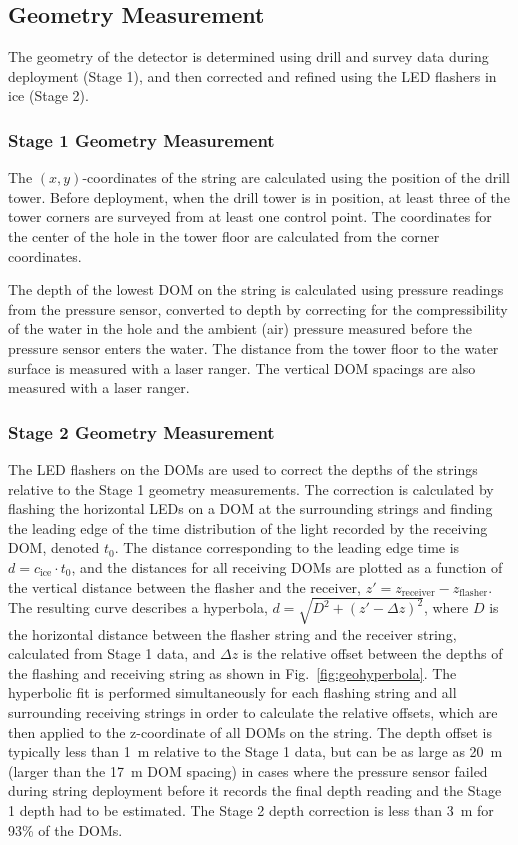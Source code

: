 \subsection{Geometry Measurement}

The geometry of the detector is determined using drill and survey data
during deployment (Stage 1), and then corrected and refined using the LED
flashers in ice (Stage 2).

\subsubsection{Stage 1 Geometry Measurement}
The $(x,y)$-coordinates of the string are calculated using the position of
the drill tower. Before deployment, when the drill tower is in position, at
least three of the tower corners are surveyed from at least one control
point.  The coordinates for the center of the hole in the tower floor are
calculated from the corner coordinates.

The depth of the lowest DOM on the string is calculated using pressure
readings from the pressure sensor, converted to depth by correcting for the
compressibility of the water in the hole and the ambient (air) pressure
measured before the pressure sensor enters the water. The distance from the
tower floor to the water surface is measured with a laser ranger. The
vertical DOM spacings are also measured with a laser ranger.

\subsubsection{Stage 2 Geometry Measurement}

The LED flashers on the DOMs are used to correct the depths of the strings relative to
the Stage 1 geometry measurements. The correction is calculated by flashing
the horizontal LEDs on a DOM at the surrounding strings and finding the
leading edge of the time distribution of the light recorded by the
receiving DOM, denoted $t_0$. The distance corresponding to the leading
edge time is $d = c_{\mathrm{ice}} \cdot t_0$, and the distances for all receiving
DOMs are plotted as a function of the vertical distance between the flasher
and the receiver, $z' = z_{\mathrm{receiver}} - z_{\mathrm{flasher}}$. The resulting curve
describes a hyperbola, $d = \sqrt{D^2 + (z' -\Delta z)^2}$, where $D$ is
the horizontal distance between the flasher string and the receiver string,
calculated from Stage 1 data, and $\Delta z$ is the relative offset between
the depths of the flashing and receiving string as shown in
Fig.~\ref{fig:geohyperbola}. The hyperbolic fit is performed simultaneously for
each flashing string and all surrounding receiving strings in order to
calculate the relative offsets, which are then applied to the z-coordinate
of all DOMs on the string. The depth offset is typically less than 1~m
relative to the Stage 1 data, but can be as large as 20~m (larger than the
17~m DOM spacing) in cases where the pressure sensor failed during string
deployment before it records the final depth reading and the Stage 1 depth
had to be estimated. The Stage 2 depth correction is less than 3~m for 93\%
of the DOMs.


